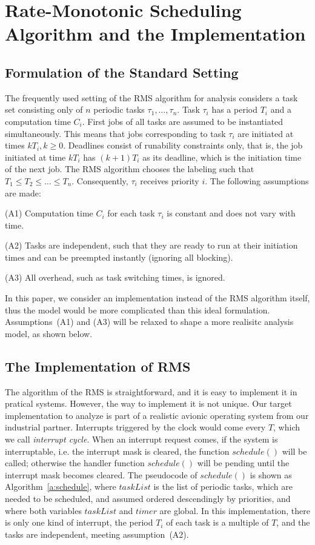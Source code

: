 \documentclass{llncs}
\begin{document}
\section{Rate-Monotonic Scheduling Algorithm and the Implementation}
\label{s:rms}
\subsection{Formulation of the Standard Setting}
The frequently used setting of the RMS algorithm for analysis
considers a task set consisting only of $n$ periodic tasks
$\tau_1,\ldots,\tau_n$. Task $\tau_i$ has a period $T_i$ and a
computation time $C_i$. First jobs of all tasks are assumed to be
instantiated simultaneously. This means that jobs corresponding to
task $\tau_i$ are initiated at times $kT_i, k\ge 0$. Deadlines consist
of runability constraints only, that is, the job initiated at time
$kT_i$ has $(k+1)T_i$ as its deadline, which is the initiation time of
the next job. The RMS algorithm chooses the labeling such that $T_1\le
T_2\le \ldots \le T_n$. Consequently, $\tau_i$ receives priority
$i$. The following assumptions are made:

(A1) Computation time $C_i$ for each task $\tau_i$ is constant and
does not vary with time.

(A2) Tasks are independent, such that they are ready to run at their
initiation times and can be preempted instantly (ignoring all
blocking).

(A3) All overhead, such as task switching times, is ignored.

In this paper, we consider an implementation instead of the RMS
algorithm itself, thus the model would be more complicated than this
ideal formulation.  Assumptions~(A1) and (A3) will be relaxed to shape a more
realisitc analysis model, as shown below.

\subsection{The Implementation of RMS}
The algorithm of the RMS is straightforward, and it is easy to
implement it in pratical systems. However, the way to implement it is
not unique. Our target implementation to analyze is part of a
realistic avionic operating system from our industrial
partner. Interrupts triggered by the clock would come every $T$, which
we call \emph{interrupt cycle}. When an interrupt request comes, if
the system is interruptable, i.e. the interrupt mask is cleared, the
function $schedule()$ will be called; otherwise the handler function
$schedule()$ will be pending until the interrupt mask becomes cleared.
The pseudocode of $schedule()$ is shown as Algorithm~\ref{a:schedule},
where $taskList$ is the list of periodic tasks, which are needed to be
scheduled, and assumed ordered descendingly by priorities, and where
both variables $taskList$ and $timer$ are global. In this
implementation, there is only one kind of interrupt, the period $T_i$
of each task is a multiple of $T$, and the tasks are independent,
meeting assumption~(A2).
\end{document}
